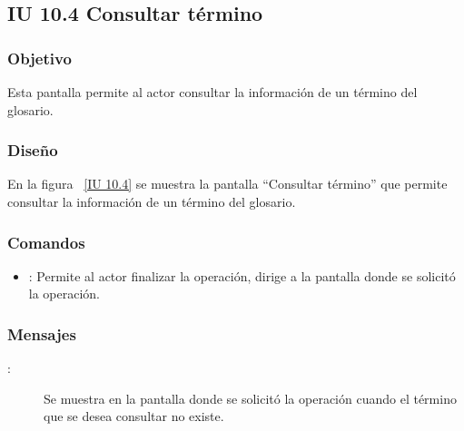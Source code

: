 \subsection{IU 10.4 Consultar término}

\subsubsection{Objetivo}
	
	Esta pantalla permite al actor consultar la información de un término del glosario.

\subsubsection{Diseño}

    En la figura ~\ref{IU 10.4} se muestra la pantalla ``Consultar término'' que permite consultar la información de un término del glosario. \\



\subsubsection{Comandos}
\begin{itemize}
	\item {}: Permite al actor finalizar la operación, dirige a la pantalla donde se solicitó la operación.
\end{itemize}

\subsubsection{Mensajes}
	
\begin{description}
	\item[:] Se muestra en la pantalla donde se solicitó la operación cuando el término que se desea consultar no existe.
\end{description}
